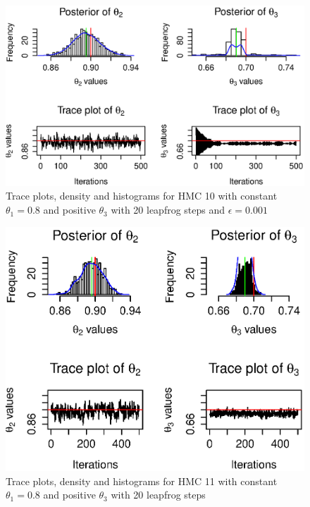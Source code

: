 \documentclass[a4paper,11pt]{article}
\begin{document}


\begin{figure}[H]
\centering
\includegraphics[width=150mm]{hmcplots10_combined.eps}
\caption{Trace plots, density and histograms for HMC 10 with constant $\theta_1 = 0.8$ and positive $\theta_3$ with 20 leapfrog steps and $\epsilon = 0.001$}
\end{figure}



\begin{figure}[H]
\centering
\includegraphics[width=150mm]{hmcplots11_combined.eps}
\caption{Trace plots, density and histograms for HMC 11 with constant $\theta_1 = 0.8$ and positive $\theta_3$ with 20 leapfrog steps}
\end{figure}
\end{document}
